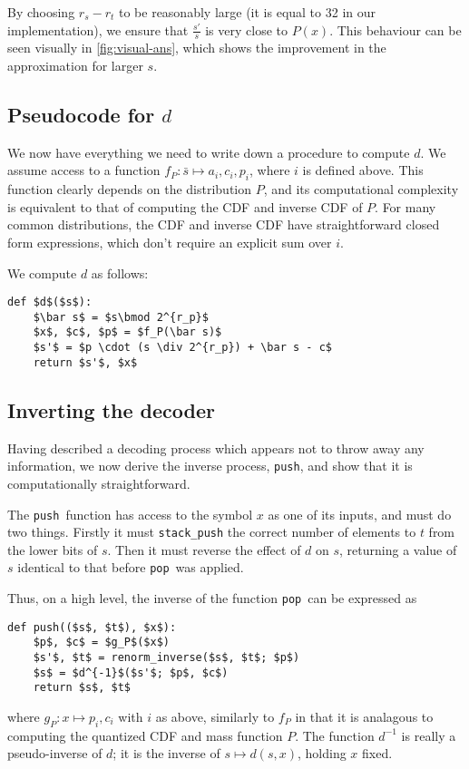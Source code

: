 \documentclass{article}
\theoremstyle{definition}
\newcommand{\push}{\texttt{push}}
\newcommand{\pop}{\texttt{pop}}
\begin{document}
By choosing \(r_s - r_t\) to be reasonably
large (it is equal to 32 in our implementation), we ensure that
\(\frac{s'}{s}\) is very close to \(P(x)\). This behaviour can be seen visually
in \cref{fig:visual-ans}, which shows the improvement in the approximation for
larger \(s\).

\subsection{Pseudocode for \(d\)}
We now have everything we need to write down a procedure to compute \(d\). We
assume access to a function \(f_P:\bar{s}\mapsto a_i, c_i, p_i\), where \(i\)
is defined above. This function clearly depends on the distribution \(P\), and
its computational complexity is equivalent to that of computing the CDF and
inverse CDF of \(P\). For many common distributions, the CDF and inverse CDF
have straightforward closed form expressions, which don't require an explicit
sum over \(i\).

We compute \(d\) as follows:
\begin{lstlisting}
def $d$($s$):
    $\bar s$ = $s\bmod 2^{r_p}$
    $x$, $c$, $p$ = $f_P(\bar s)$
    $s'$ = $p \cdot (s \div 2^{r_p}) + \bar s - c$
    return $s'$, $x$
\end{lstlisting}

\subsection{Inverting the decoder}
Having described a decoding process which appears not to throw away any
information, we now derive the inverse process, \push, and show that it is
computationally straightforward.

The \push\ function has access to the symbol \(x\) as one of its inputs, and
must do two things. Firstly it must \texttt{stack\_push} the correct number of
elements to \(t\) from the lower bits of \(s\). Then it must reverse the effect
of \(d\) on \(s\), returning a value of \(s\) identical to that before \pop\
was applied.

Thus, on a high level, the inverse of the function \pop\ can be expressed as
\begin{lstlisting}
def push(($s$, $t$), $x$):
    $p$, $c$ = $g_P$($x$)
    $s'$, $t$ = renorm_inverse($s$, $t$; $p$)
    $s$ = $d^{-1}$($s'$; $p$, $c$)
    return $s$, $t$
\end{lstlisting}
where \(g_P:x\mapsto p_i, c_i\) with \(i\) as above, similarly to \(f_P\) in
that it is analagous to computing the quantized CDF and mass function \(P\).
The function \(d^{-1}\) is really a pseudo-inverse of \(d\); it is the inverse
of \(s\mapsto d(s, x)\), holding \(x\) fixed.
\end{document}
